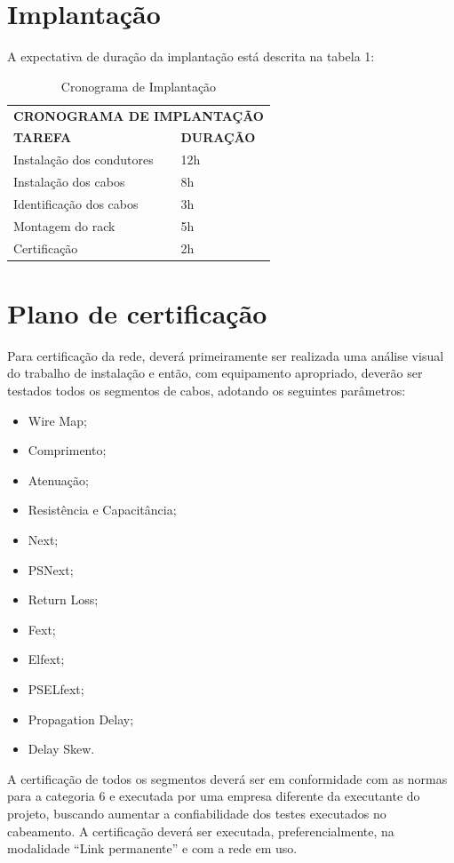 \documentclass[	DIV=calc,%
							paper=a4,%
							fontsize=12pt,%
							onecolumn]{scrartcl}	 					%
\begin{document}
\section{Implantação}
A expectativa de duração da implantação está descrita na tabela 1:
\begin{table}[h!]
	\centering
	\caption{Cronograma de Implantação}
	\label{cronograma-implantacao}
	\begin{tabular}{ll}
		\multicolumn{2}{l}{\textbf{CRONOGRAMA DE IMPLANTAÇÃO}} \\
		\textbf{TAREFA}                & \textbf{DURAÇÃO}      \\
		Instalação dos condutores      & 12h                   \\
		Instalação dos cabos           & 8h                    \\
		Identificação dos cabos        & 3h                    \\
		Montagem do rack               & 5h                    \\
		Certificação                   & 2h                   
	\end{tabular}
\end{table}

\section{Plano de certificação}
Para certificação da rede, deverá primeiramente ser realizada uma análise visual do trabalho de instalação e então, com equipamento apropriado, deverão ser testados todos os segmentos de cabos, adotando os seguintes parâmetros:

\begin{itemize}
	\item Wire Map;
	\item Comprimento;
	\item Atenuação;
	\item Resistência e Capacitância;
	\item Next;
	\item PSNext;
	\item Return Loss;
	\item Fext;
	\item Elfext;
	\item PSELfext;
	\item Propagation Delay;
	\item Delay Skew.
\end{itemize}

A certificação de todos os segmentos deverá ser em conformidade com as normas para a categoria 6 e executada por uma empresa diferente da executante do projeto, buscando aumentar a confiabilidade dos testes executados no cabeamento. A certificação deverá ser executada, preferencialmente, na modalidade “Link permanente” e com a rede em uso.
\end{document}
